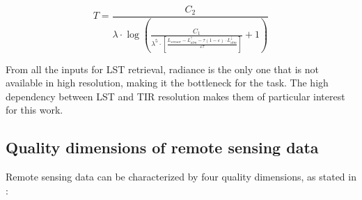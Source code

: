         \begin{equation}
            T = \frac{C_2}{\lambda \cdot \log\left(\frac{C_1}{\lambda^5 \cdot \left[ \frac{L_{sensor} - L_{atm}^{\uparrow}- \tau (1 - \varepsilon) \cdot L_{atm}^{\downarrow}}{\varepsilon \tau}  \right]}+1\right)}
        \end{equation}

        From all the inputs for LST retrieval, radiance is the only one that is not available in high resolution, making it the bottleneck for the task. The high dependency between LST and TIR resolution makes them of particular interest for this work.
        
       

    \subsection{Quality dimensions of remote sensing data}

    Remote sensing data can be characterized by four quality dimensions, as stated in \cite{HORNING20082986}:

